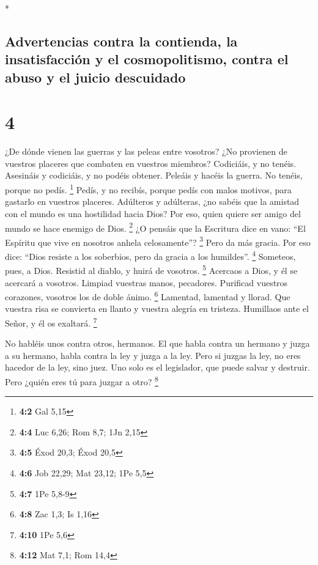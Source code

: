 \begin{paracol}{2}
\switchcolumn[0]*

\hypertarget{advertencias-contra-la-contienda-la-insatisfacciuxf3n-y-el-cosmopolitismo-contra-el-abuso-y-el-juicio-descuidado}{%
\subsection{Advertencias contra la contienda, la insatisfacción y el
cosmopolitismo, contra el abuso y el juicio
descuidado}\label{advertencias-contra-la-contienda-la-insatisfacciuxf3n-y-el-cosmopolitismo-contra-el-abuso-y-el-juicio-descuidado}}

\hypertarget{section-6}{%
\section{4}\label{section-6}}

 ¿De dónde vienen las guerras y las peleas entre vosotros?
¿No provienen de vuestros placeres que combaten en vuestros miembros?
 Codiciáis, y no tenéis. Asesináis y codiciáis, y no
podéis obtener. Peleáis y hacéis la guerra. No tenéis, porque no pedís.
\footnote{\textbf{4:2} Gal 5,15}  Pedís, y no recibís,
porque pedís con malos motivos, para gastarlo en vuestros placeres.
 Adúlteros y adúlteras, ¿no sabéis que la amistad con el
mundo es una hostilidad hacia Dios? Por eso, quien quiere ser amigo del
mundo se hace enemigo de Dios. \footnote{\textbf{4:4} Luc 6,26; Rom 8,7;
  1Jn 2,15}  ¿O pensáis que la Escritura dice en vano:
``El Espíritu que vive en nosotros anhela celosamente''? \footnote{\textbf{4:5}
  Éxod 20,3; Éxod 20,5}  Pero da más gracia. Por eso dice:
``Dios resiste a los soberbios, pero da gracia a los humildes''.
\footnote{\textbf{4:6} Job 22,29; Mat 23,12; 1Pe 5,5} 
Someteos, pues, a Dios. Resistid al diablo, y huirá de vosotros.
\footnote{\textbf{4:7} 1Pe 5,8-9}  Acercaos a Dios, y él
se acercará a vosotros. Limpiad vuestras manos, pecadores. Purificad
vuestros corazones, vosotros los de doble ánimo. \footnote{\textbf{4:8}
  Zac 1,3; Is 1,16}  Lamentad, lamentad y llorad. Que
vuestra risa se convierta en llanto y vuestra alegría en tristeza.
 Humillaos ante el Señor, y él os exaltará. \footnote{\textbf{4:10}
  1Pe 5,6}

 No habléis unos contra otros, hermanos. El que habla
contra un hermano y juzga a su hermano, habla contra la ley y juzga a la
ley. Pero si juzgas la ley, no eres hacedor de la ley, sino juez.
 Uno solo es el legislador, que puede salvar y destruir.
Pero ¿quién eres tú para juzgar a otro? \footnote{\textbf{4:12} Mat 7,1;
  Rom 14,4}


\end{paracol}
